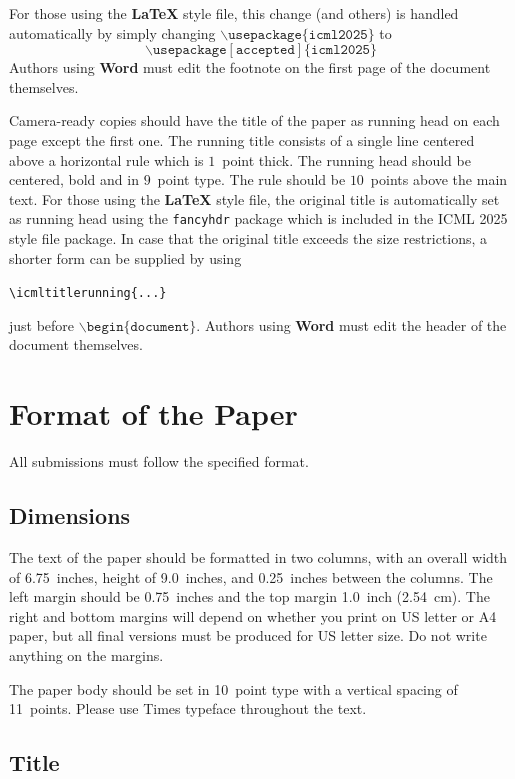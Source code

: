 \documentclass{article}
\theoremstyle{plain}
\theoremstyle{definition}
\theoremstyle{remark}
\begin{document}
For those using the \textbf{\LaTeX} style file, this change (and others) is
handled automatically by simply changing
$\mathtt{\backslash usepackage\{icml2025\}}$ to
$$\mathtt{\backslash usepackage[accepted]\{icml2025\}}$$
Authors using \textbf{Word} must edit the
footnote on the first page of the document themselves.

Camera-ready copies should have the title of the paper as running head
on each page except the first one. The running title consists of a
single line centered above a horizontal rule which is $1$~point thick.
The running head should be centered, bold and in $9$~point type. The
rule should be $10$~points above the main text. For those using the
\textbf{\LaTeX} style file, the original title is automatically set as running
head using the \texttt{fancyhdr} package which is included in the ICML
2025 style file package. In case that the original title exceeds the
size restrictions, a shorter form can be supplied by using

\verb|\icmltitlerunning{...}|

just before $\mathtt{\backslash begin\{document\}}$.
Authors using \textbf{Word} must edit the header of the document themselves.





\section{Format of the Paper}

All submissions must follow the specified format.

\subsection{Dimensions}




The text of the paper should be formatted in two columns, with an
overall width of 6.75~inches, height of 9.0~inches, and 0.25~inches
between the columns. The left margin should be 0.75~inches and the top
margin 1.0~inch (2.54~cm). The right and bottom margins will depend on
whether you print on US letter or A4 paper, but all final versions
must be produced for US letter size.
Do not write anything on the margins.

The paper body should be set in 10~point type with a vertical spacing
of 11~points. Please use Times typeface throughout the text.

\subsection{Title}
\end{document}
